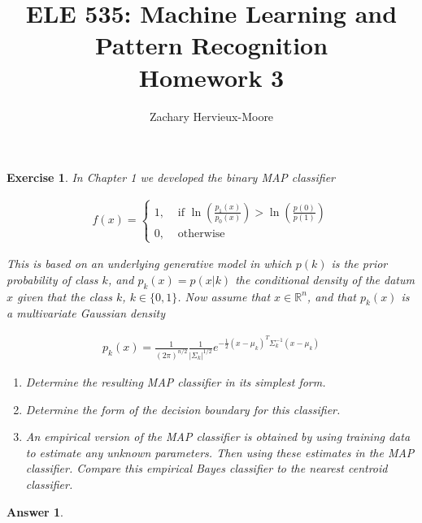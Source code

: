 \documentclass[12pt]{article}
\title{ELE 535: Machine Learning and Pattern Recognition \\ Homework 3}
\author{Zachary Hervieux-Moore}
\date{\displaydate{date}}
\theoremstyle{colon}
\newtheorem{exercise}{Exercise}
\newtheorem*{answer}{Answer}
\begin{document}
\maketitle

\clearpage

\begin{exercise}
  In Chapter 1 we developed the binary MAP classifier

  \begin{gather*}
    f(x) = \begin{cases}
      1, &\text{ if } \ln \left( \frac{p_1(x)}{p_0(x)} \right) > \ln \left( \frac{p(0)}{p(1)} \right) \\
      0, &\text{ otherwise}
    \end{cases}
  \end{gather*}

  This is based on an underlying generative model in which $p(k)$ is the prior probability of class $k$, and $p_k(x) = p(x | k)$ the conditional density of the datum $x$ given that the class $k$, $k \in \{0, 1\}$. Now assume that $x \in \mathbb{R}^n$, and that $p_k(x)$ is a multivariate Gaussian density

  \begin{gather*}
    p_k(x) = \frac{1}{(2 \pi)^{n/2}} \frac{1}{\lvert \Sigma_k \rvert^{1/2}} e^{-\frac{1}{2} (x - \mu_k)^T \Sigma_k^{-1} (x - \mu_k)}
  \end{gather*}

  \begin{enumerate}[label=\alph*)]
    \item Determine the resulting MAP classifier in its simplest form.
    \item Determine the form of the decision boundary for this classifier.
    \item An empirical version of the MAP classifier is obtained by using training data to estimate any unknown parameters. Then using these estimates in the MAP classifier. Compare this empirical Bayes classifier to the nearest centroid classifier.
  \end{enumerate}
\end{exercise}

\begin{answer}
\end{answer}

\clearpage
\end{document}
